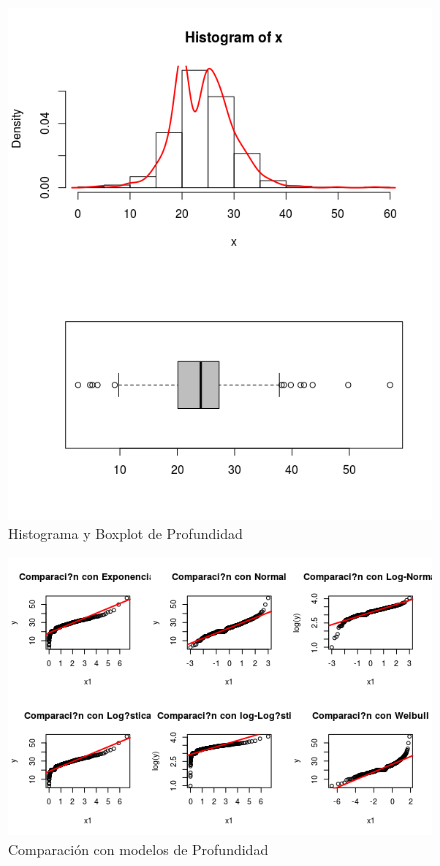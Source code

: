 \documentclass{article}
\begin{document}
\begin{enumerate}[a)]
\begin{figure}[h!]
\centering
\includegraphics[scale=0.5]{./figures/hisplot_Profundidad.png}
\caption{Histograma y Boxplot de Profundidad}
\end{figure}

\begin{figure}[h!]
\centering
\includegraphics[scale=0.5]{./figures/cm_Profundidad.png}
\caption{Comparación con modelos de Profundidad}
\end{figure}


\end{enumerate}
\end{document}
